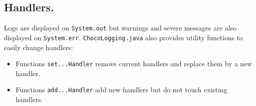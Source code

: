 \subsection{Handlers.}\label{advanced:handlers}\hypertarget{advanced:handlers}{}
Logs are displayed on \texttt{System.out} but warnings and severe messages are also displayed on \texttt{System.err}.
\texttt{ChocoLogging.java} also provides utility functions to easily change handlers:
\begin{itemize}
	\item Functions \texttt{set...Handler} remove current handlers and replace them by a new handler.
	\item Functions \texttt{add...Handler} add new handlers but do not touch existing handlers.
\end{itemize}

	
	
      
      
      
      
      
      
      
